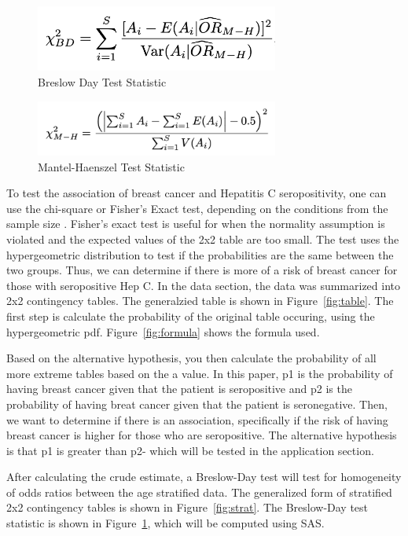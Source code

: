 \documentclass[12pt, titlepage]{article}
\begin{document}
\begin{figure}[tbp]
  \centering
  \includegraphics[width=8cm]{breslow day test stat.png}
  \caption{Breslow Day Test Statistic}
  \label{fig:BD}
\end{figure}

\begin{figure}[tbp]
  \centering
  \includegraphics[width=8cm]{MH Test Stat.png}
  \caption{Mantel-Haenszel Test Statistic}
  \label{fig:MH}
\end{figure}


To test the association of breast cancer and Hepatitis C seropositivity, one can use
the chi-square or Fisher's Exact test, depending on the
conditions from the sample size \citep{warner2013testing}. Fisher's
exact test is useful for when the normality assumption is violated 
and the expected values of the 2x2 table are too small. The test uses 
the hypergeometric distribution to test if the probabilities are
the same between the two groups. Thus, we can determine if there is 
more of a risk of breast cancer for those with seropositive Hep C.
In the data section, the data was summarized into 2x2 contingency tables.
The generalzied table is shown in Figure~\ref{fig:table}.
The first step is calculate the probability of the original table occuring,
using the hypergeometric pdf. Figure~\ref{fig:formula} shows the formula used.

Based on the alternative hypothesis, you then calculate the probability of 
all more extreme tables based on the a value. In this paper, p1 is the
probability of having breast cancer given that the patient is seropositive
and p2 is the probability of having breat cancer given that the patient
is seronegative. Then, we want to determine if there is an association,
specifically if the risk of having breast cancer is higher for those who
are seropositive. The alternative hypothesis is that p1 is greater than p2-
which will be tested in the application section.

After calculating the crude estimate, a Breslow-Day test will test for 
homogeneity of odds ratios between the age stratified data. The generalized
form of stratified 2x2 contingency tables is shown in Figure~\ref{fig:strat}.
The Breslow-Day test statistic is shown in Figure~\ref{fig:BD}, which will
be computed using SAS.
\end{document}

